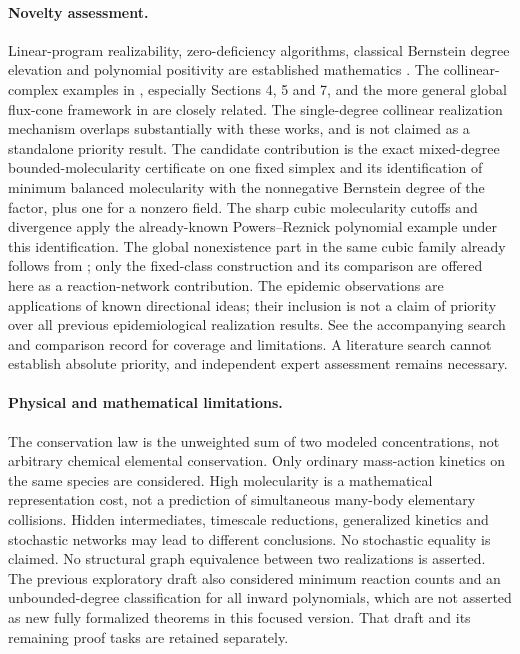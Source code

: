 \documentclass[11pt]{article}
\begin{document}
\paragraph{Novelty assessment.} Linear-program realizability, zero-deficiency algorithms, classical Bernstein degree elevation and polynomial positivity are established mathematics \cite{szed,efficient,algorithm,buxton,powersreznick2000}. The collinear-complex examples in \cite{disguised}, especially Sections 4, 5 and 7, and the more general global flux-cone framework in \cite{boros} are closely related. The single-degree collinear realization mechanism overlaps substantially with these works, and is not claimed as a standalone priority result. The candidate contribution is the exact mixed-degree bounded-molecularity certificate on one fixed simplex and its identification of minimum balanced molecularity with the nonnegative Bernstein degree of the factor, plus one for a nonzero field. The sharp cubic molecularity cutoffs and divergence apply the already-known Powers--Reznick polynomial example under this identification. The global nonexistence part in the same cubic family already follows from \cite[Theorem~4.3]{disguised}; only the fixed-class construction and its comparison are offered here as a reaction-network contribution. The epidemic observations are applications of known directional ideas; their inclusion is not a claim of priority over all previous epidemiological realization results. See the accompanying search and comparison record for coverage and limitations. A literature search cannot establish absolute priority, and independent expert assessment remains necessary.

\paragraph{Physical and mathematical limitations.} The conservation law is the unweighted sum of two modeled concentrations, not arbitrary chemical elemental conservation. Only ordinary mass-action kinetics on the same species are considered. High molecularity is a mathematical representation cost, not a prediction of simultaneous many-body elementary collisions. Hidden intermediates, timescale reductions, generalized kinetics and stochastic networks may lead to different conclusions. No stochastic equality is claimed. No structural graph equivalence between two realizations is asserted. The previous exploratory draft also considered minimum reaction counts and an unbounded-degree classification for all inward polynomials, which are not asserted as new fully formalized theorems in this focused version. That draft and its remaining proof tasks are retained separately.
\end{document}
